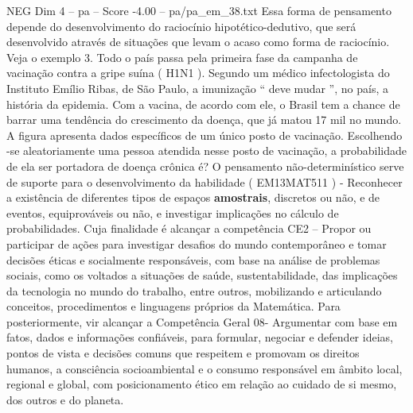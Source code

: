\begin{textsample}{NEG Dim 4 – pa – Score -4.00 – pa/pa\_em\_38.txt}
Essa forma de pensamento depende do desenvolvimento do raciocínio hipotético-dedutivo, que será desenvolvido através de situações que levam o acaso como forma de raciocínio.
Veja o exemplo 3.
Todo o país passa pela primeira fase da campanha de vacinação contra a gripe suína ( H1N1 ).
Segundo um médico infectologista do Instituto Emílio Ribas, de São Paulo, a imunização “ deve mudar ”, no país, a história da epidemia.
Com a vacina, de acordo com ele, o Brasil tem a chance de barrar uma tendência do crescimento da doença, que já matou 17 mil no mundo.
A figura apresenta dados específicos de um único posto de vacinação.
Escolhendo -se aleatoriamente uma pessoa atendida nesse posto de vacinação, a probabilidade de ela ser portadora de doença crônica é?
O pensamento não-determinístico serve de suporte para o desenvolvimento da habilidade ( EM13MAT511 ) - Reconhecer a existência de diferentes tipos de espaços \textbf{amostrais}, discretos ou não, e de eventos, equiprováveis ou não, e investigar implicações no cálculo de probabilidades.
Cuja finalidade é alcançar a competência CE2 – Propor ou participar de ações para investigar desafios do mundo contemporâneo e tomar decisões éticas e socialmente responsáveis, com base na análise de problemas sociais, como os voltados a situações de saúde, sustentabilidade, das implicações da tecnologia no mundo do trabalho, entre outros, mobilizando e articulando conceitos, procedimentos e linguagens próprios da Matemática.
Para posteriormente, vir alcançar a Competência Geral 08- Argumentar com base em fatos, dados e informações confiáveis, para formular, negociar e defender ideias, pontos de vista e decisões comuns que respeitem e promovam os direitos humanos, a consciência socioambiental e o consumo responsável em âmbito local, regional e global, com posicionamento ético em relação ao cuidado de si mesmo, dos outros e do planeta.

\end{textsample}
